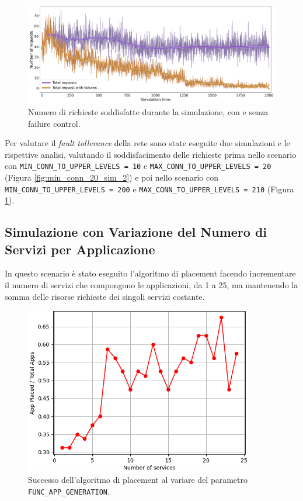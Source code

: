 \begin{figure}[!ht]
  \includegraphics[width=12cm]{images/min_conn_200_sim_1}
  \centering
  \caption{Numero di richieste soddisfatte durante la simulazione, con e senza failure control.}
  \label{fig:min_conn_200_sim_1}
\end{figure}

Per valutare il \textit{fault tollerance} della rete sono state eseguite due simulazioni e le rispettive analisi, valutando il soddisfacimento delle richieste prima nello scenario con \texttt{MIN\_CONN\_TO\_UPPER\_LEVELS = 10} e \texttt{MAX\_CONN\_TO\_UPPER\_LEVELS = 20} (Figura \ref{fig:min_conn_20_sim_2}) e poi nello scenario con \texttt{MIN\_CONN\_TO\_UPPER\_LEVELS = 200} e \texttt{MAX\_CONN\_TO\_UPPER\_LEVELS = 210} (Figura \ref{fig:min_conn_200_sim_1}).



\subsection{Simulazione con Variazione del Numero di Servizi per Applicazione}

In questo scenario è stato eseguito l'algoritmo di placement facendo incrementare il numero di servizi che compongono le applicazioni, da 1 a 25, ma mantenendo la somma delle risorse richieste dei singoli servizi costante.

\begin{figure}[!ht]
  \includegraphics[width=10cm]{images/service_per_app_success}
  \centering
  \caption{Successo dell'algoritmo di placement al variare del parametro \texttt{FUNC\_APP\_GENERATION}.}
  \label{fig:service_per_app_success}
\end{figure}


